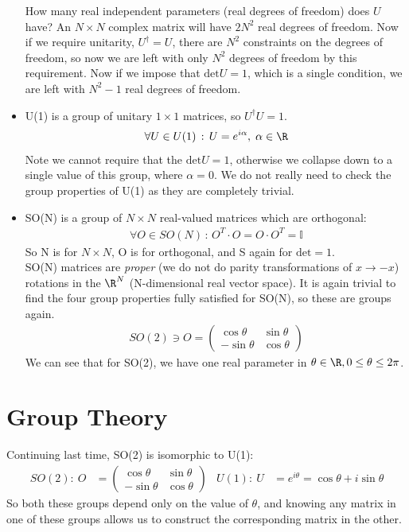 \documentclass[a4paper, 11pt, normalem]{report}
\begin{document}
\begin{itemize}
        How many real independent parameters (real degrees of freedom) does $U$ have?
        An $N\times N$ complex matrix will have $2N^2$ real degrees of freedom.
        Now if we require unitarity, $U^\dagger = U$, there are $N^2$ constraints on the degrees of freedom, so now we are left with only $N^2$ degrees of freedom by this requirement.
        Now if we impose that $\text{det}U = 1$, which is a single condition, we are left with $N^2-1$ real degrees of freedom.
    \item U(1) is a group of unitary $1\times1$ matrices, so $U^\dagger U = 1$.
        \begin{align}
            \forall U \in U(1)\,:\, U = e^{i\alpha},\; \alpha \in \R
        \end{align}
        Note we cannot require that the $\text{det}U=1$, otherwise we collapse down to a single value of this group, where $\alpha=0$.
        We do not really need to check the group properties of U(1) as they are completely trivial.
    \item SO(N) is a group of $N\times N$ real-valued matrices which are orthogonal:
        \begin{align}
            \forall O \in SO(N)\,:\, O^T\cdot O = O\cdot O^T = \mathbb{I}
        \end{align}
        So N is for $N\times N$, O is for orthogonal, and S again for $\text{det}=1$.\\
        SO(N) matrices are \emph{proper} (we do not do parity transformations of $x\to -x$) rotations in the $\R^N$ (N-dimensional real vector space).
        It is again trivial to find the four group properties fully satisfied for SO(N), so these are groups again.
        \begin{align}
            SO(2) \ni O = \begin{pmatrix} \cos\theta & \sin\theta \\ -\sin\theta & \cos\theta\end{pmatrix}
        \end{align}
        We can see that for SO(2), we have one real parameter in $\theta\in\R,0\leq\theta\leq2\pi$.
\end{itemize}

\chapter{Group Theory}
Continuing last time, SO(2) is isomorphic to U(1):
\begin{align}
    SO(2):~ O &= \begin{pmatrix}\cos\theta & \sin\theta \\ -\sin\theta & \cos\theta\end{pmatrix} & U(1):~ U &= e^{i\theta} = \cos\theta + i\sin\theta
\end{align}
So both these groups depend only on the value of $\theta$, and knowing any matrix in one of these groups allows us to construct the corresponding matrix in the other.
\end{document}
